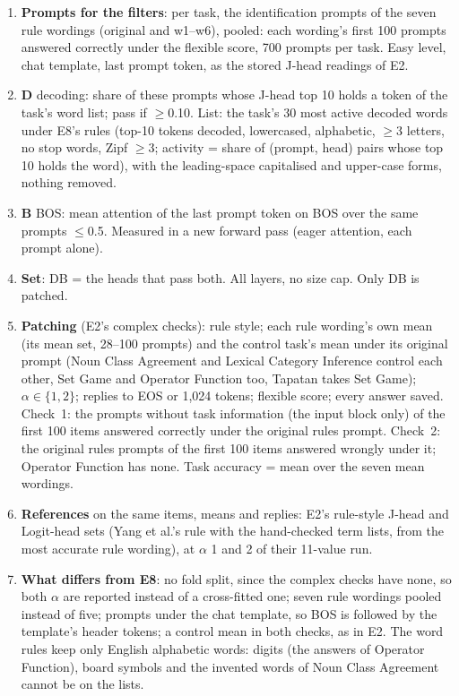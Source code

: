 \documentclass[10pt,a4paper]{article}
\begin{document}
\begin{enumerate}
\item \textbf{Prompts for the filters}: per task, the identification prompts of the seven rule wordings (original and w1--w6), pooled: each wording's first 100 prompts answered correctly under the flexible score, 700 prompts per task. Easy level, chat template, last prompt token, as the stored J-head readings of E2.
\item \textbf{D} decoding: share of these prompts whose J-head top 10 holds a token of the task's word list; pass if $\geq$0.10. List: the task's 30 most active decoded words under E8's rules (top-10 tokens decoded, lowercased, alphabetic, $\geq$3 letters, no stop words, Zipf $\geq$3; activity = share of (prompt, head) pairs whose top 10 holds the word), with the leading-space capitalised and upper-case forms, nothing removed.
\item \textbf{B} BOS: mean attention of the last prompt token on BOS over the same prompts $\leq$0.5. Measured in a new forward pass (eager attention, each prompt alone).
\item \textbf{Set}: DB = the heads that pass both. All layers, no size cap. Only DB is patched.
\item \textbf{Patching} (E2's complex checks): rule style; each rule wording's own mean (its mean set, 28--100 prompts) and the control task's mean under its original prompt (Noun Class Agreement and Lexical Category Inference control each other, Set Game and Operator Function too, Tapatan takes Set Game); $\alpha\in\{1,2\}$; replies to EOS or 1{,}024 tokens; flexible score; every answer saved. Check~1: the prompts without task information (the input block only) of the first 100 items answered correctly under the original rules prompt. Check~2: the original rules prompts of the first 100 items answered wrongly under it; Operator Function has none. Task accuracy = mean over the seven mean wordings.
\item \textbf{References} on the same items, means and replies: E2's rule-style J-head and Logit-head sets (Yang et al.'s rule with the hand-checked term lists, from the most accurate rule wording), at $\alpha$ 1 and 2 of their 11-value run.
\item \textbf{What differs from E8}: no fold split, since the complex checks have none, so both $\alpha$ are reported instead of a cross-fitted one; seven rule wordings pooled instead of five; prompts under the chat template, so BOS is followed by the template's header tokens; a control mean in both checks, as in E2. The word rules keep only English alphabetic words: digits (the answers of Operator Function), board symbols and the invented words of Noun Class Agreement cannot be on the lists.
\end{enumerate}
\end{document}

